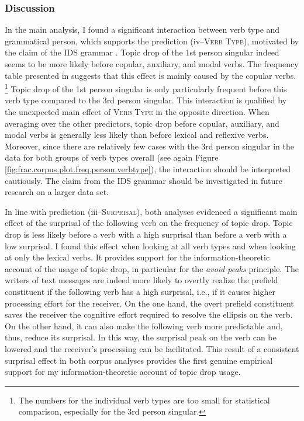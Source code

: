 \subsubsection{Discussion}\label{sec:corpus.inference.rep.diss}
In the main analysis, I found a significant interaction between verb type and grammatical person, which supports the prediction (iv--\textsc{Verb Type}), motivated by the claim of the IDS grammar \citep{zifonun.etal1997}.
Topic drop of the 1st person singular indeed seems to be more likely before copular, auxiliary, and modal verbs.
The frequency table presented in  suggests that this effect is mainly caused by the copular verbs.%
\footnote{The numbers for the individual verb types are too small for statistical comparison, especially for the 3rd person singular.}
Topic drop of the 1st person singular is only particularly frequent before this verb type compared to the 3rd person singular.
This interaction is qualified by the unexpected main effect of \textsc{Verb Type} in the opposite direction.
When averaging over the other predictors, topic drop before copular, auxiliary, and modal verbs is generally less likely than before lexical and reflexive verbs.
Moreover, since there are relatively few cases with the 3rd person singular in the data for both groups of verb types overall (see again Figure \ref{fig:frac.corpus.plot.freq.person.verbtype}), the interaction should be interpreted cautiously.
The claim from the IDS grammar should be investigated in future research on a larger data set.

In line with prediction (iii--\textsc{Surprisal}), both analyses evidenced a significant main effect of the surprisal of the following verb on the frequency of topic drop.
Topic drop is less likely before a verb with a high surprisal than before a verb with a low surprisal.
I found this effect when looking at all verb types and when looking at only the lexical verbs.
It provides support for the information-theoretic account of the usage of topic drop, in particular for the \textit{avoid peaks} principle.
The writers of text messages are indeed more likely to overtly realize the prefield constituent if the following verb has a high surprisal, i.e., if it causes higher processing effort for the receiver.
On the one hand, the overt prefield constituent saves the receiver the cognitive effort required to resolve the ellipsis on the verb.
On the other hand, it can also make the following verb more predictable  and, thus, reduce its surprisal.
In this way, the surprisal peak on the verb can be lowered and the receiver's processing can be facilitated.
This result of a consistent surprisal effect in both corpus analyses provides the first genuine empirical support for my information-theoretic account of topic drop usage.

